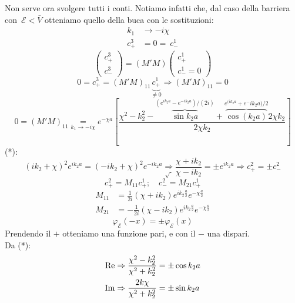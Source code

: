 \documentclass[../../FisicaTeorica.tex]{subfiles}
\begin{document}
Non serve ora svolgere tutti i conti. Notiamo infatti che, dal caso della barriera con\ $\mathcal{E}<\bar{V}$ otteniamo quello della buca con le sostituzioni:
\begin{align*}
k_1 &\to -i\chi\\
c^3_+ &= 0 =\ c^1_-
\end{align*}
\[
\begin{pmatrix}
c^3_+\\
c^3_-
\end{pmatrix} = (M'M)
\begin{pmatrix}
c^1_+\\
c^1_- = 0
\end{pmatrix}
\]
\[
0 = c^3_+ = (M'M)_{11} \underbrace{c^1_+}_{\neq 0}\Rightarrow (M'M)_{11}=0 
\]
\[
0 = (M'M)_{11} \underset{k_1\to-i\chi}{=}e^{-\chi a}
\left [
\frac{\chi^2-k_2^2-\overbrace{\sin k_2 a}^{(e^{ik_2 a}-e^{-ik_2 a})/(2i)} + \overbrace{\cos(k_2 a)}^{e^{(ik_2 a}+e^-ik_2 a)/2} 2\chi k_2}{2\chi k_2}
\right ]
\]
(*):
\[
(ik_2 + \chi)^2 e^{ik_2 a}=(-ik_2 + \chi)^2 e^{-ik_2 a} \underset{\sqrt{\cdot}}{\Rightarrow} \frac{\chi + ik_2}{\chi-ik_2} = \pm e^{ik_2 a} \Rightarrow c^2_+ = \pm c^2_-
\]
\[
c^2_+ = M_{11}c^1_+; \quad c^2_- = M_{21} c^1_+
\]
\begin{align*}
M_{11} &= \frac{1}{2i}(\chi + ik_2)e^{ik_2 \frac{a}{2}}e^{-\chi\frac{a}{2}}\\
M_{21} &= -\frac{1}{2i}(\chi-ik_2)e^{ik_2 \frac{a}{2}}e^{-\chi\frac{a}{2}}
\end{align*}
\[
\varphi_\mathcal{E}(-x)=\pm \varphi_\mathcal{E}(x)
\]
Prendendo il $+$ otteniamo una funzione pari, e con il $-$ una dispari.\\
Da (*):
\begin{align*}
\operatorname{Re}&\Rightarrow \frac{\chi^2-k_2^2}{\chi^2+k_2^2} = \pm \cos k_2 a\\
\operatorname{Im} &\Rightarrow \frac{2k \chi}{\chi^2 + k_2^2}=\pm \sin k_2 a
\end{align*}
\end{document}
